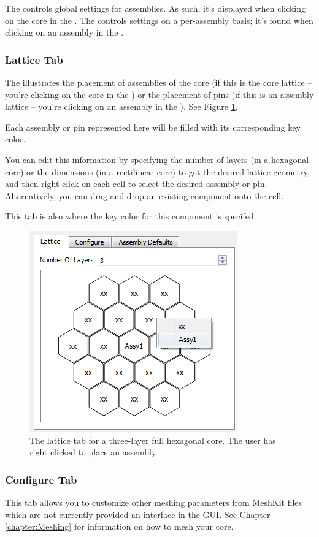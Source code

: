\begin{commonerrors}
	The  controls global settings for assemblies.  As such, it's displayed when clicking on the core in the .  The  controls settings on a per-assembly basis; it's found when clicking on an assembly in the .
\end{commonerrors}

\subsubsection{Lattice Tab}
The  illustrates the placement of assemblies of the core (if this is the core lattice -- you're clicking on the core in the ) or the placement of pins (if this is an assembly lattice -- you're clicking on an assembly in the ).  See Figure \ref{fig:latticetab}.

Each assembly or pin represented here will be filled with its corresponding key color.

You can edit this information by specifying the number of layers (in a hexagonal core) or the dimensions (in a rectilinear core) to get the desired lattice geometry, and then right-click on each cell to select the desired assembly or pin.  Alternatively, you can drag and drop an existing component onto the cell.

This tab is also where the key color for this component is specifed.

\begin{figure}[h]
	\begin{center}
		\includegraphics[width=0.3\linewidth]{Images/hex-19.png}
		\caption{The lattice tab for a three-layer full hexagonal core.  The user has right clicked to place an assembly.}
		\label{fig:latticetab}
	\end{center}
\end{figure}

\subsubsection{Configure Tab}
This tab allows you to customize other meshing parameters from MeshKit files which are not currently provided an interface in the GUI. See Chapter \ref{chapter:Meshing} for information on how to mesh your core.

